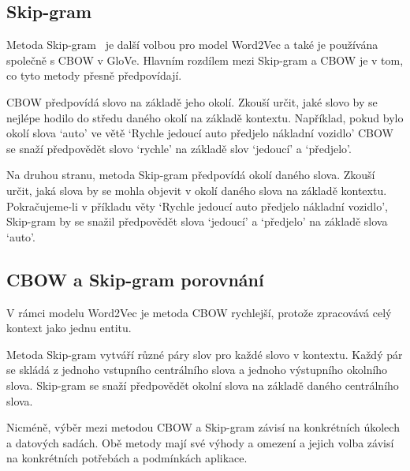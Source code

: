 \subsection{Skip-gram}
Metoda Skip-gram~\cite{link13} je další volbou pro model Word2Vec a také je používána společně s CBOW v GloVe.
Hlavním rozdílem mezi Skip-gram a CBOW je v tom, co tyto metody přesně předpovídají.

CBOW předpovídá slovo na základě jeho okolí.
Zkouší určit, jaké slovo by se nejlépe hodilo do středu daného okolí na základě kontextu.
Například, pokud bylo okolí slova `auto' ve větě `Rychle jedoucí auto předjelo nákladní vozidlo' CBOW se snaží předpovědět slovo `rychle' na základě slov `jedoucí' a `předjelo'.

Na druhou stranu, metoda Skip-gram předpovídá okolí daného slova.
Zkouší určit, jaká slova by se mohla objevit v okolí daného slova na základě kontextu.
Pokračujeme-li v příkladu věty `Rychle jedoucí auto předjelo nákladní vozidlo', Skip-gram by se snažil předpovědět slova `jedoucí' a `předjelo' na základě slova `auto'.

\subsection{CBOW a Skip-gram porovnání}
V rámci modelu Word2Vec je metoda CBOW rychlejší, protože zpracovává celý kontext jako jednu entitu.

Metoda Skip-gram vytváří různé páry slov pro každé slovo v kontextu.
Každý pár se skládá z jednoho vstupního centrálního slova a jednoho výstupního okolního slova.
Skip-gram se snaží předpovědět okolní slova na základě daného centrálního slova.

Nicméně, výběr mezi metodou CBOW a Skip-gram závisí na konkrétních úkolech a datových sadách.
Obě metody mají své výhody a omezení a jejich volba závisí na konkrétních potřebách a podmínkách aplikace.

\endinput